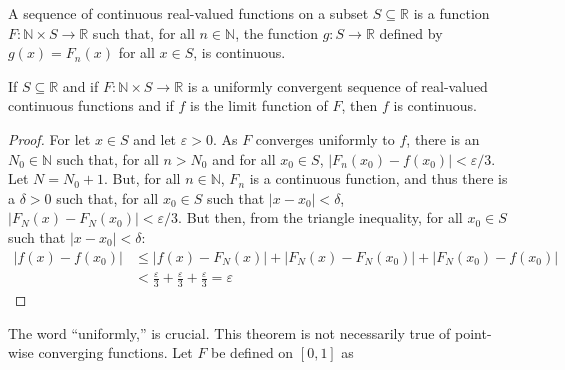             \begin{definition}
                A sequence of continuous real-valued functions
                on a subset $S\subseteq\mathbb{R}$ is a
                function
                $F:\mathbb{N}\times{S}\rightarrow\mathbb{R}$
                such that, for all $n\in\mathbb{N}$, the function
                $g:S\rightarrow\mathbb{R}$ defined by
                $g(x)=F_{n}(x)$ for all $x\in{S}$,
                is continuous.
            \end{definition}
            \begin{theorem}
                If $S\subseteq\mathbb{R}$ and if
                $F:\mathbb{N}\times{S}\rightarrow\mathbb{R}$
                is a uniformly convergent sequence of
                real-valued continuous functions and if
                ${f}$ is the limit function of $F$, then
                $f$ is continuous.
            \end{theorem}
            \begin{proof}
                For let $x\in{S}$ and let
                $\varepsilon>0$. As $F$ converges
                uniformly to $f$, there is an
                $N_{0}\in\mathbb{N}$ such that, for all
                $n>N_{0}$ and for all $x_{0}\in{S}$,
                $|F_{n}(x_{0})-f(x_{0})|<\varepsilon/3$.
                Let $N=N_{0}+1$.
                But, for all $n\in\mathbb{N}$,
                $F_{n}$ is a continuous function, and
                thus there is a $\delta>0$ such that,
                for all $x_{0}\in{S}$ such that
                $|x-x_{0}|<\delta$,
                $|F_{N}(x)-F_{N}(x_{0})|<\varepsilon/3$.
                But then, from the triangle inequality,
                for all $x_{0}\in{S}$ such that
                $|x-x_{0}|<\delta$:
                \begin{align}
                    \nonumber
                    |f(x)-f(x_{0})|&\leq
                    |f(x)-F_{N}(x)|
                    +|F_{N}(x)-F_{N}(x_{0})|
                    +|F_{N}(x_{0})-f(x_{0})|\\
                    &<\frac{\varepsilon}{3}+
                    \frac{\varepsilon}{3}+
                    \frac{\varepsilon}{3}
                    =\varepsilon
                \end{align}
            \end{proof}
            The word ``uniformly,'' is crucial.
            This theorem is not necessarily true of
            point-wise converging functions. Let $F$ be
            defined on $[0,1]$ as
